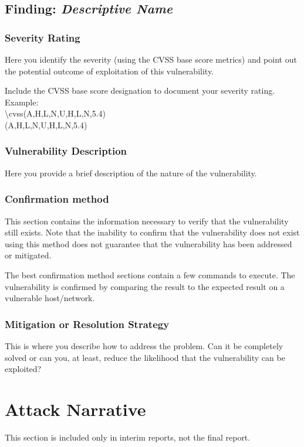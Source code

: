 \documentclass[notitlepage]{article}
\begin{document}
	
	\subsection{Finding: \emph{Descriptive Name}}
	
	\subsubsection{Severity Rating}
	Here you identify the severity (using the CVSS base score metrics)
	and point out the potential outcome of exploitation of this
	vulnerability.
	
	Include the CVSS base score designation to document your
	severity rating. Example: \\
	
	\textbackslash cvss(A,H,L,N,U,H,L,N,5.4)\\
	\cvss(A,H,L,N,U,H,L,N,5.4)
	
	\subsubsection{Vulnerability Description}
	Here you provide a brief description of the nature of the vulnerability.
	
	\subsubsection{Confirmation method}
	This section contains the information necessary to verify that the
	vulnerability still exists. Note that the inability to confirm
	that the vulnerability does not exist using this method does not
	guarantee that the vulnerability has been addressed or mitigated.
	
	The best confirmation method sections contain a few commands
	to execute. The vulnerability is confirmed by comparing
	the result to the expected result on a vulnerable host/network.
	
	\subsubsection{Mitigation or Resolution Strategy}
	This is where you describe how to address the problem.
	Can it be completely solved or can you, at least, reduce the
	likelihood that the vulnerability can be exploited?
	
	
	
	
	\section{Attack Narrative}
	This section is included only in interim reports, not the final report.
	
\end{document}
